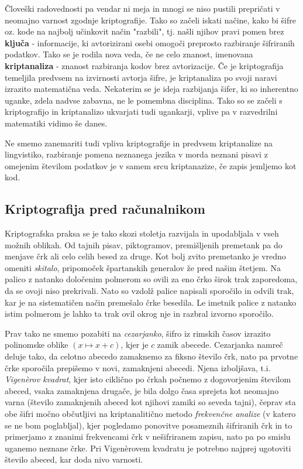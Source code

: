 \documentclass[a4paper, 12pt]{article} %
\begin{document}
\newline
\newline
Človeški radovednosti pa vendar ni meja in mnogi se niso pustili prepričati v neomajno varnost zgodnje kriptografije. Tako so začeli iskati načine, kako bi šifre oz. kode na najbolj učinkovit način "razbili", tj. našli njihov pravi pomen brez \textbf{ključa} - informacije, ki avtorizirani osebi omogoči preprosto razbiranje šifriranih podatkov. Tako se je rodila nova veda, če ne celo znanost, imenovana \textbf{kriptanaliza} - znanost razbiranja kodov brez avtorizacije. Če je kriptografija temeljila predvsem na izvirnosti avtorja šifre, je kriptanaliza po svoji naravi izrazito matematična veda. Nekaterim se je ideja razbijanja šifer, ki so inherentno uganke, zdela nadvse zabavna, ne le pomembna disciplina. Tako so se začeli s kriptografijo in kriptanalizo ukvarjati tudi ugankarji, vplive pa v razvedrilni matematiki vidimo še danes.

Ne smemo zanemariti tudi vpliva kriptografije in predvsem kriptanalize na lingvistiko, razbiranje pomena neznanega jezika v morda neznani pisavi z omejenim številom podatkov je v samem srcu kriptanazize, če zapis jemljemo kot kod.

\subsection{Kriptografija pred računalnikom}

Kriptografska praksa se je tako skozi stoletja razvijala in upodabljala v vseh možnih oblikah. Od tajnih pisav, piktogramov, premišljenih premetank pa do menjave črk ali celo celih besed za druge. Kot bolj zvito premetanko je vredno omeniti \emph{skitalo}, pripomoček špartanskih generalov že pred našim štetjem. Na palico z natanko določenim polmerom so ovili za eno črko širok trak zaporedoma, da se ovoji niso prekrivali. Nato so vzdolž palice napisali sporočilo in odvili trak, kar je na sistematičen način premešalo črke besedila. Le imetnik palice z natanko istim polmerom je lahko ta trak ovil okrog nje in razbral izvorno sporočilo.

Prav tako ne smemo pozabiti na \emph{cezarjanko}, šifro iz rimskih časov izrazito polinomske oblike $(x \mapsto x + c)$, kjer je $c$ zamik abecede. Cezarjanka namreč deluje tako, da celotno abecedo zamaknemo za fiksno število črk, nato pa prvotne črke sporočila prepišemo v novi, zamaknjeni abecedi. Njena izboljšava, t.i. \emph{Vigen\`{e}rov kvadrat}, kjer isto ciklično po črkah počnemo z dogovorjenim številom abeced, vsaka zamaknjena drugače, je bila dolgo časa sprejeta kot neomajno varna (število zamaknjenih abeced kot njihovi zamiki so seveda tajni), čeprav sta obe šifri močno občutljivi na kriptanalitično metodo \emph{frekvenčne analize} (v katero se ne bom poglabljal), kjer pogledamo ponovitve posameznih šifriranih črk in to primerjamo z znanimi frekvencami črk v nešifriranem zapisu, nato pa po smislu uganemo neznane črke. Pri Vigen\`{e}rovem kvadratu je potrebno najprej ugotoviti število abeced, kar doda nivo varnosti.
\end{document}
